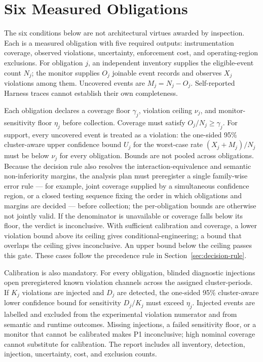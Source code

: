\section{Six Measured Obligations}
\label{sec:obligations}

The six conditions below are not architectural virtues awarded by inspection. Each is a measured obligation with five required outputs: instrumentation coverage, observed violations, uncertainty, enforcement cost, and operating-region exclusions. For obligation $j$, an independent inventory supplies the eligible-event count $N_j$; the monitor supplies $O_j$ joinable event records and observes $X_j$ violations among them. Uncovered events are $M_j=N_j-O_j$. Self-reported Harness traces cannot establish their own completeness.

Each obligation declares a coverage floor $\gamma_j$, violation ceiling $\nu_j$, and monitor-sensitivity floor $\eta_j$ before collection. Coverage must satisfy $O_j/N_j\geq\gamma_j$. For support, every uncovered event is treated as a violation: the one-sided 95\% cluster-aware upper confidence bound $U_j$ for the worst-case rate $(X_j+M_j)/N_j$ must be below $\nu_j$ for every obligation. Bounds are not pooled across obligations. Because the decision rule also resolves the interaction-equivalence and semantic non-inferiority margins, the analysis plan must preregister a single family-wise error rule --- for example, joint coverage supplied by a simultaneous confidence region, or a closed testing sequence fixing the order in which obligations and margins are decided --- before collection; the per-obligation bounds are otherwise not jointly valid. If the denominator is unavailable or coverage falls below its floor, the verdict is inconclusive. With sufficient calibration and coverage, a lower violation bound above its ceiling gives conditional-engineering; a bound that overlaps the ceiling gives inconclusive. An upper bound below the ceiling passes this gate. These cases follow the precedence rule in Section~\ref{sec:decision-rule}.

Calibration is also mandatory. For every obligation, blinded diagnostic injections open preregistered known violation channels across the assigned cluster-periods. If $K_j$ violations are injected and $D_j$ are detected, the one-sided 95\% cluster-aware lower confidence bound for sensitivity $D_j/K_j$ must exceed $\eta_j$. Injected events are labelled and excluded from the experimental violation numerator and from semantic and runtime outcomes. Missing injections, a failed sensitivity floor, or a monitor that cannot be calibrated makes P1 inconclusive; high nominal coverage cannot substitute for calibration. The report includes all inventory, detection, injection, uncertainty, cost, and exclusion counts.

